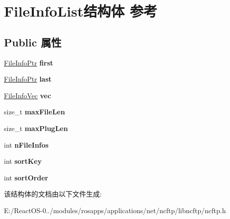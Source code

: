 \hypertarget{struct_file_info_list}{}\section{File\+Info\+List结构体 参考}
\label{struct_file_info_list}
\subsection*{Public 属性}
\begin{DoxyCompactItemize}
\item 
\mbox{\label{struct_file_info_list_a2ae7b821342245ddb382159244261ea0}} 
\hyperlink{struct_file_info}{File\+Info\+Ptr} {\bfseries first}
\item 
\mbox{\label{struct_file_info_list_a25d2d175e76196ff5b5983bd7dd43d4f}} 
\hyperlink{struct_file_info}{File\+Info\+Ptr} {\bfseries last}
\item 
\mbox{\label{struct_file_info_list_a6026329f69c2df4155bf3138c006a32f}} 
\hyperlink{struct_file_info}{File\+Info\+Vec} {\bfseries vec}
\item 
\mbox{\label{struct_file_info_list_a9144ac36fe80a5b08ce0ed330eed0664}} 
size\+\_\+t {\bfseries max\+File\+Len}
\item 
\mbox{\label{struct_file_info_list_aa10c19105039d81de5fe26baf7ff249f}} 
size\+\_\+t {\bfseries max\+Plug\+Len}
\item 
\mbox{\label{struct_file_info_list_a50b2b9672d0869f5222624a60a8c172a}} 
int {\bfseries n\+File\+Infos}
\item 
\mbox{\label{struct_file_info_list_ac91e6fc08fa86684989681b627e87fb8}} 
int {\bfseries sort\+Key}
\item 
\mbox{\label{struct_file_info_list_aa0094f31981ede047fe8bdef9a4fc908}} 
int {\bfseries sort\+Order}
\end{DoxyCompactItemize}


该结构体的文档由以下文件生成\+:\begin{DoxyCompactItemize}
\item 
E\+:/\+React\+O\+S-\/0../modules/rosapps/applications/net/ncftp/libncftp/ncftp.\+h\end{DoxyCompactItemize}
